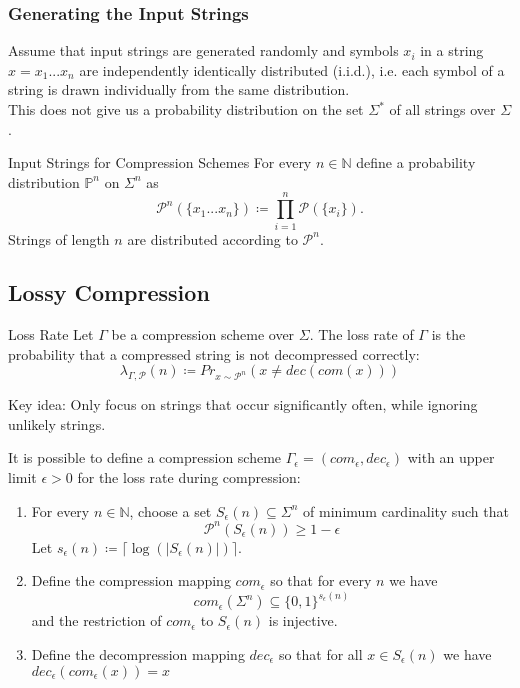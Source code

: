 \documentclass[english]{panikzettel}
\begin{document}
\subsubsection{Generating the Input Strings}
Assume that input strings are generated randomly and symbols $x_i$ in a string $x=x_1...x_n$ are independently identically distributed (i.i.d.), i.e. each symbol of a string is drawn individually from the same distribution.\\
This does not give us a probability distribution on the set $\Sigma^*$ of all strings over $\Sigma$.

\begin{defi}{Input Strings for Compression Schemes}
For every $n\in\mathbb{N}$ define a probability distribution $\mathbb{P}^n$ on $\Sigma^n$ as
\[
\mathcal{P}^n(\{x_1 ... x_n \})\coloneqq \prod_{i=1}^n \mathcal{P}(\{x_i \}).
\]
Strings of length $n$ are distributed according to $\mathcal{P}^n$.
\end{defi}


\subsection{Lossy Compression}

\begin{defi}{Loss Rate}
Let $\Gamma$ be a compression scheme over $\Sigma$. The loss rate of $\Gamma$ is the probability that a compressed string is not decompressed correctly:
\[
\lambda_{\Gamma, \mathcal{P}}(n)\coloneqq Pr_{x \sim \mathcal{P}^n}(x \neq dec(com(x)))
\]
\end{defi}

Key idea: Only focus on strings that occur significantly often, while ignoring unlikely strings.

It is possible to define a compression scheme $\Gamma_\epsilon=(com_\epsilon, dec_\epsilon)$ with an upper limit $\epsilon>0$ for the loss rate during compression:
\begin{enumerate}
\item For every $n\in\mathbb{N}$, choose a set $S_\epsilon(n)\subseteq \Sigma^n$ of minimum cardinality such that
\[
\mathcal{P}^n(S_\epsilon (n))\geq 1-\epsilon
\]
Let $s_\epsilon(n) \coloneqq \lceil\log (|S_\epsilon(n)|)\rceil$.
\item Define the compression mapping $com_\epsilon$ so that for every $n$ we have
\[
com_\epsilon(\Sigma^n)\subseteq \{0,1\}^{s_\epsilon(n)}
\]
and the restriction of $com_\epsilon$ to $S_\epsilon(n)$ is injective.
\item Define the decompression mapping $dec_\epsilon$ so that for all $x\in S_\epsilon(n)$ we have $dec_\epsilon(com_\epsilon(x))=x$
\end{enumerate}
\end{document}
